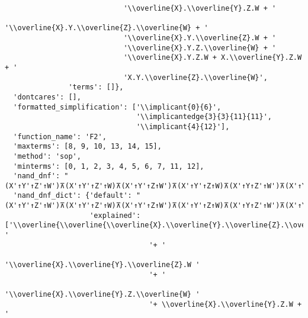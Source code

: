 \begin{verbatim}
                            '\\overline{X}.\\overline{Y}.Z.W + '
                            '\\overline{X}.Y.\\overline{Z}.\\overline{W} + '
                            '\\overline{X}.Y.\\overline{Z}.W + '
                            '\\overline{X}.Y.Z.\\overline{W} + '
                            '\\overline{X}.Y.Z.W + X.\\overline{Y}.Z.W + '
                            'X.Y.\\overline{Z}.\\overline{W}',
               'terms': []},
  'dontcares': [],
  'formatted_simplification': ['\\implicant{0}{6}',
                               '\\implicantedge{3}{3}{11}{11}',
                               '\\implicant{4}{12}'],
  'function_name': 'F2',
  'maxterms': [8, 9, 10, 13, 14, 15],
  'method': 'sop',
  'minterms': [0, 1, 2, 3, 4, 5, 6, 7, 11, 12],
  'nand_dnf': "(X'↑Y'↑Z'↑W')⊼(X'↑Y'↑Z'↑W)⊼(X'↑Y'↑Z↑W')⊼(X'↑Y'↑Z↑W)⊼(X'↑Y↑Z'↑W')⊼(X'↑Y↑Z'↑W)⊼(X'↑Y↑Z↑W')⊼(X'↑Y↑Z↑W)⊼(X↑Y'↑Z↑W)⊼(X↑Y↑Z'↑W')",
  'nand_dnf_dict': {'default': "(X'↑Y'↑Z'↑W')⊼(X'↑Y'↑Z'↑W)⊼(X'↑Y'↑Z↑W')⊼(X'↑Y'↑Z↑W)⊼(X'↑Y↑Z'↑W')⊼(X'↑Y↑Z'↑W)⊼(X'↑Y↑Z↑W')⊼(X'↑Y↑Z↑W)⊼(X↑Y'↑Z↑W)⊼(X↑Y↑Z'↑W')",
                    'explained': ['\\overline{\\overline{\\overline{X}.\\overline{Y}.\\overline{Z}.\\overline{W} '
                                  '+ '
                                  '\\overline{X}.\\overline{Y}.\\overline{Z}.W '
                                  '+ '
                                  '\\overline{X}.\\overline{Y}.Z.\\overline{W} '
                                  '+ \\overline{X}.\\overline{Y}.Z.W + '

\end{verbatim}
